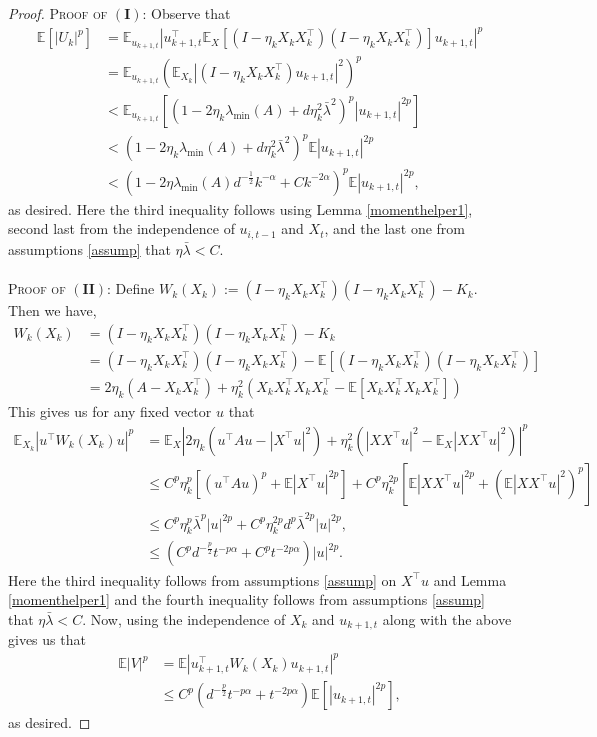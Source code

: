 \documentclass[11pt, reqno,english]{amsart}
\begin{document}
\begin{proof}
\textsc{Proof of $(\mathbf{I})$:}
Observe that
\begin{align*}
\mathbb{E}[|U_k|^p] &= \mathbb{E}_{u_{k+1,t}}|u^\top_{k+1,t}\mathbb{E}_X[(I - \eta_{k}X_{k}X^\top_{k})(I - \eta_{k}X_{k}X^\top_{k})]u_{k+1,t}|^p
\\
&= \mathbb{E}_{u_{k+1,t}}(\mathbb{E}_{X_k}|(I - \eta_k X_k X_k^\top)u_{k+1,t}|^2)^p 
\\
&< \mathbb{E}_{u_{k+1,t}}[(1 - 2\eta_{k}\lambda_{\min}(A) + d\eta^2_{k}\bar{\lambda}^2)^p|u_{k+1,t}|^{2p}]
\\
&< (1 - 2\eta_{k}\lambda_{\min}(A) + d\eta^2_k\bar{\lambda}^2)^p \mathbb{E}|u_{k+1,t}|^{2p}
\\
&< (1 - 2\eta\lambda_{\min}(A)d^{-\frac{1}{2}}k^{-\alpha} + Ck^{-2\alpha})^p \mathbb{E}|u_{k+1,t}|^{2p},
\end{align*}
as desired. Here the third inequality follows using Lemma \ref{momenthelper1}, second last from the independence of $u_{i,t-1}$ and $X_t$, and the last one from assumptions \ref{assump} that $\eta \bar{\lambda} < C$.
\\\\
\textsc{Proof of $(\mathbf{II})$:}
Define $W_k(X_k) := (I - \eta_kX_kX_k^\top)(I - \eta_k X_k X_k^\top) - K_k$. Then we have,
\begin{align*}
W_k(X_k) &= (I - \eta_k X_k X_k^\top)(I - \eta_k X_k X_k^\top) - K_k
\\
&= (I - \eta_k X_k X_k^\top)(I - \eta_k X_k X_k^\top) - \mathbb{E}[(I - \eta_k X_k X_k^\top)(I - \eta_k X_k X_k^\top)]
\\
&= 2\eta_k (A - X_k X_k^\top) + \eta_k^2 (X_k X_k^\top X_k X^\top_k - \mathbb{E}[X_k X_k^\top X_k X^\top_k])
\end{align*}
This gives us for any fixed vector $u$ that
\begin{align*}
\mathbb{E}_{X_k} |u^\top W_k(X_k) u|^{p} &=  \mathbb{E}_{X}|2\eta_k(u^\top A u -  |X^\top u|^2) + \eta_k^2 (|XX^\top u|^2 - \mathbb{E}_X|XX^\top u|^2)|^{p}
\\
&\leq C^p \eta_k^p[(u^\top A u)^p + \mathbb{E}|X^\top u|^{2p}] + C^p \eta_k^{2p}[\mathbb{E}|XX^\top u|^{2p} + (\mathbb{E}|XX^\top u|^2)^p] 
\\
&\leq C^p \eta_k^p \bar{\lambda}^p |u|^{2p} + C^p \eta_k^{2p}d^p \bar{\lambda}^{2p}|u|^{2p},
\\
&\leq (C^pd^{-\frac{p}{2}}t^{-p\alpha} + C^p t^{-2p\alpha})|u|^{2p}.
\end{align*}
Here the third inequality follows from assumptions \ref{assump} on $X^\top u$ and Lemma \ref{momenthelper1} and the fourth inequality follows from assumptions \ref{assump} that $\eta \bar{\lambda} < C$. Now, using the independence of $X_k$ and $u_{k+1,t}$ along with the above gives us that
\begin{align*}
\mathbb{E}|V|^p &= \mathbb{E}|u_{k+1,t}^\top W_k(X_k) u_{k+1,t}|^p
\\
&\leq C^p(d^{-\frac{p}{2}}t^{-p\alpha} + t^{-2p\alpha})\mathbb{E}[|u_{k+1,t}|^{2p}],
\end{align*}
as desired.
\end{proof}
\end{document}
